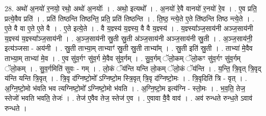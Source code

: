 \documentclass[17pt]{extarticle}
\begin{document}
28. अथो॑ अ॒नयो॑ र॒नयो॒ रथो॒ अथो॑ अ॒नयोः᳚ । . अथो॒ इत्यथो᳚ । . अ॒नयो॑ रे॒वै वानयो॑ र॒नयो॑ रे॒व । . ए॒व प्रति॒ प्रत्ये॒वैव प्रति॑ । . प्रति॑ तिष्ठन्ति तिष्ठन्ति॒ प्रति॒ प्रति॑ तिष्ठन्ति । . ति॒ष्ठ॒ न्त्ये॒ते ए॒ते ति॑ष्ठन्ति तिष्ठ न्त्ये॒ते । . ए॒ते वै वा ए॒ते ए॒ते वै । . ए॒ते इत्ये॒ते । . वै य॒ज्ञ्स्य॑ य॒ज्ञ्स्य॒ वै वै य॒ज्ञ्स्य॑ । . य॒ज्ञ्स्या᳚ञ्ज॒साय॑नी अञ्ज॒साय॑नी य॒ज्ञ्स्य॑ य॒ज्ञ्स्या᳚ञ्ज॒साय॑नी । . अ॒ञ्ज॒साय॑नी स्रु॒ती स्रु॒ती अ॑ञ्ज॒साय॑नी अञ्ज॒साय॑नी स्रु॒ती । . अ॒ञ्ज॒साय॑नी॒ इत्य॑ञ्जसा - अय॑नी । . स्रु॒ती ताभ्या॒म् ताभ्याꣳ॑ स्रु॒ती स्रु॒ती ताभ्या᳚म् । . स्रु॒ती इति॑ स्रु॒ती । . ताभ्या॑ मे॒वैव ताभ्या॒म् ताभ्या॑ मे॒व । . ए॒व सु॑व॒र्गꣳ सु॑व॒र्ग मे॒वैव सु॑व॒र्गम् । . सु॒व॒र्गम् ॅलो॒कम् ॅलो॒कꣳ सु॑व॒र्गꣳ सु॑व॒र्गम् ॅलो॒कम् । . सु॒व॒र्गमिति॑ सुवः - गम् । . लो॒कं ॅय॑न्ति यन्ति लो॒कम् ॅलो॒कं ॅय॑न्ति । . य॒न्ति॒ त्रि॒वृत् त्रि॒वृद् य॑न्ति यन्ति त्रि॒वृत् । . त्रि॒वृ द॑ग्निष्टो॒मो᳚ ऽग्निष्टो॒म स्त्रि॒वृत् त्रि॒वृ द॑ग्निष्टो॒मः । . त्रि॒वृदिति॑ त्रि - वृत् । . अ॒ग्नि॒ष्टो॒मो भ॑वति भव त्यग्निष्टो॒मो᳚ ऽग्निष्टो॒मो भ॑वति । . अ॒ग्नि॒ष्टो॒म इत्य॑ग्नि - स्तो॒मः । . भ॒व॒ति॒ तेज॒ स्तेजो॑ भवति भवति॒ तेजः॑ । . तेज॑ ए॒वैव तेज॒ स्तेज॑ ए॒व । . ए॒वावा वै॒वै वाव॑ । . अव॑ रुन्धते रुन्ध॒ते ऽवाव॑ रुन्धते । \newline
\end{document}
